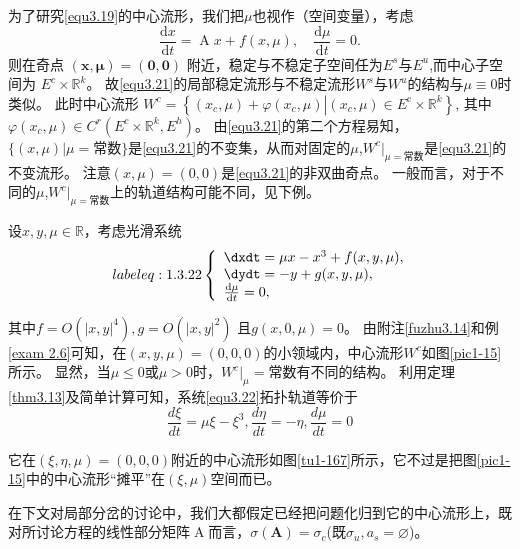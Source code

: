 \begin{corollary}
	为了研究\ref{equ3.19}的中心流形，我们把\(\mu\)也视作（空间变量），考虑
	\begin{equation}
		\frac { \mathrm { d } x } { \mathrm { d } t } = \operatorname { A } x + f ( x , \mu ) ,
		\quad
		\frac { \mathrm { d } \mu } { \mathrm { d } t } = 0.
		\label{eq:1.3.21}
	\end{equation}
	则在奇点
	$( \mathbf{x} ,\mathbf{ \mu} ) = (\mathbf{ 0},\mathbf{0} )$
	附近，稳定与不稳定子空间任为\(E^s\)与\(E^u\),而中心子空间为
	$E^{c} \times \mathbb{R}^{k}$。
	故\ref{equ3.21}的局部稳定流形与不稳定流形\(W^s\)与\(W^u\)的结构与$\mu \equiv 0$时类似。
	此时中心流形
	$W ^ { c } = \left\{ \left( x _ { c } , \mu \right)+ \varphi \left( x _ { c } , \mu \right) \left| \left( x _ { c } , \mu \right) \in E ^ { \mathrm { c } } \times \mathbb { R } ^ { k }\right.\right\}$,
	其中$\varphi \left( x _ { c } , \mu \right) \in C ^ { r } \left( E ^ { c } \times \mathbb{ R } ^ { k },E^h\right)$。
	由\ref{equ3.21}的第二个方程易知，
	$\{ ( x , \mu ) | \mu =常数\}$是\ref{equ3.21}的不变集，从而对固定的\(\mu\),\(W^c|_{\mu=常数}\)是\ref{equ3.21}的不变流形。
	注意$( x , \mu ) = ( 0,0 )$是\ref{equ3.21}的非双曲奇点。
	一般而言，对于不同的\(\mu\),\(W^c|_{\mu=常数}\)上的轨道结构可能不同，见下例。
\end{corollary}

\begin{example}
	设$x , y , \mu \in \mathbb { R }$，考虑光滑系统
	\begin{equation}
		\ label{eq:1.3.22}
		\left\{
		\begin{array}{l}
			{\dxdt= \mu x - x ^ { 3 } + f ( x , y , \mu ) }, \\
			{\dydt= - y + g ( x , y , \mu ) } ,              \\
			{ \frac{\mathrm{d}\mu}{\mathrm{d} t } = 0 },
		\end{array}
		\right.
	\end{equation}
	
	其中$f = O \left( | x , y | ^ { 4 } \right) , g = O \left( | x , y | ^ { 2 } \right)$
	且$g ( x , 0 , \mu ) = 0$。
	由附注\ref{fuzhu3.14}和例\ref{exam 2.6}可知，在$\left( x , y , { \mu } \right) = ( 0,0,0 )$的小领域内，中心流形\(W^c\)如图\ref{pic1-15}所示。
	显然，当$\mu \leqslant 0$或$\mu > 0$时，\(W^c|_\mu=常数\)有不同的结构。
	利用定理\ref{thm3.13}及简单计算可知，系统\ref{equ3.22}拓扑轨道等价于
	\[
		\frac { d \xi } { d t } = \mu \xi  - \xi ^ { 3 } ,
		\frac { d \eta } { d t } = - \eta ,
		\frac { d \mu } { d t } = 0
	\]
	
	它在$( \xi , \eta , \mu ) = ( 0,0,0 )$附近的中心流形如图\ref{tu1-167}所示，它不过是把图\ref{pic1-15}中的中心流形“摊平”在$( \xi , \mu )$空间而已。
\end{example}

在下文对局部分岔的讨论中，我们大都假定已经把问题化归到它的中心流形上，既对所讨论方程的线性部分矩阵\(\operatorname{A}\)而言，$\sigma ( \mathbf { A } )= \sigma _ { c }$(既$\sigma _ { u } , a _ { s } = \varnothing$)。
